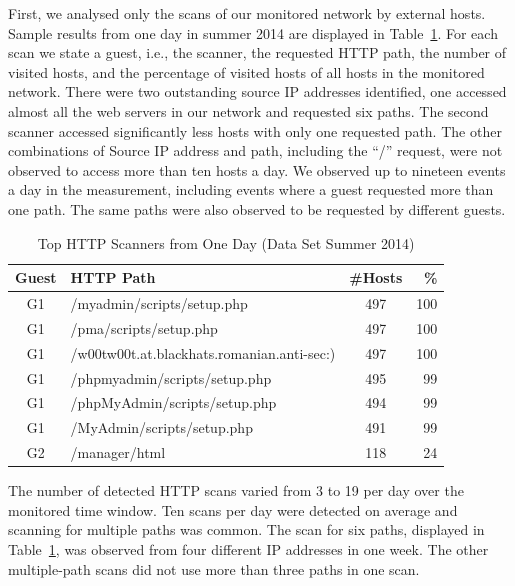 First, we analysed only the scans of our monitored network by external hosts. Sample results from one day in summer 2014 are displayed in Table~\ref{tab:httpsecurity-scanners}. For each scan we state a guest, i.e., the scanner, the requested HTTP path, the number of visited hosts, and the percentage of visited hosts of all hosts in the monitored network. There were two outstanding source IP addresses identified, one accessed almost all the web servers in our network and requested six paths. The second scanner accessed significantly less hosts with only one requested path. The other combinations of Source IP address and path, including the ``/'' request, were not observed to access more than ten hosts a day. We observed up to nineteen events a day in the measurement, including events where a guest requested more than one path. The same paths were also observed to be requested by different guests.

\begin{table}[ht]
\centering
\begin{tabular}{| c | l | c | r |} \hline
Guest & HTTP Path & \#Hosts & \% \\ \hline
G1 & /myadmin/scripts/setup.php                 & 497 & 100 \\ \hline
G1 & /pma/scripts/setup.php                     & 497 & 100 \\ \hline
G1 & /w00tw00t.at.blackhats.romanian.anti-sec:) & 497 & 100 \\ \hline
G1 & /phpmyadmin/scripts/setup.php              & 495 &  99 \\ \hline
G1 & /phpMyAdmin/scripts/setup.php              & 494 &  99 \\ \hline
G1 & /MyAdmin/scripts/setup.php                 & 491 &  99 \\ \hline
G2 & /manager/html                              & 118 &  24 \\ \hline
\end{tabular}
\caption{Top HTTP Scanners from One Day (Data Set Summer 2014)}
\label{tab:httpsecurity-scanners}
\end{table}

The number of detected HTTP scans varied from 3 to 19 per day over the monitored time window. Ten scans per day were detected on average and scanning for multiple paths was common. The scan for six paths, displayed in Table~\ref{tab:httpsecurity-scanners}, was observed from four different IP addresses in one week. The other multiple-path scans did not use more than three paths in one scan.

